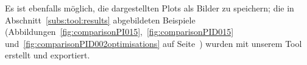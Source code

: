 Es   ist   ebenfalls   m\"oglich,   die   dargestellten   Plots   als   Bilder
zu   speichern;   die    in   Abschnitt~\ref{subs:tool:results}   abgebildeten
Beispiele   (Abbildungen~\ref{fig:comparisonPI015},~\ref{fig:comparisonPID015}
und~\ref{fig:comparisonPID002optimisations} auf Seite~\pageref{fig:comparisonPI015})
wurden mit unserem Tool erstellt und exportiert.

\clearpage
